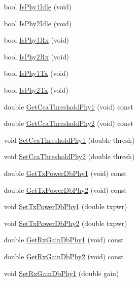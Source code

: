 \begin{DoxyCompactItemize}
bool \hyperlink{classns3_1_1UanPhyDual_a713fee4f4a35de9bdb221c438a88dc0c}{Is\+Phy1\+Idle} (void)
\item 
bool \hyperlink{classns3_1_1UanPhyDual_ab4afd036817f6497e6a714ccab5d90d3}{Is\+Phy2\+Idle} (void)
\item 
bool \hyperlink{classns3_1_1UanPhyDual_af2f8efc8f969f5f88afc81bbdcc7121d}{Is\+Phy1\+Rx} (void)
\item 
bool \hyperlink{classns3_1_1UanPhyDual_ae22b1ff319f186509609ce0b6cfbff62}{Is\+Phy2\+Rx} (void)
\item 
bool \hyperlink{classns3_1_1UanPhyDual_a5c798904649f2bdccd1d0c1bad3f8850}{Is\+Phy1\+Tx} (void)
\item 
bool \hyperlink{classns3_1_1UanPhyDual_ae32437818c85d5cfcd3ab0de93f70a26}{Is\+Phy2\+Tx} (void)
\item 
double \hyperlink{classns3_1_1UanPhyDual_a56c584e508c76f84527eca347a192313}{Get\+Cca\+Threshold\+Phy1} (void) const 
\item 
double \hyperlink{classns3_1_1UanPhyDual_a4367de133e6bceab236c6888e71f3d66}{Get\+Cca\+Threshold\+Phy2} (void) const 
\item 
void \hyperlink{classns3_1_1UanPhyDual_ad2bd673788abd93eb7c3f45cea08f3cf}{Set\+Cca\+Threshold\+Phy1} (double thresh)
\item 
void \hyperlink{classns3_1_1UanPhyDual_af2fecd3586f6a2579da091c2e811cb0e}{Set\+Cca\+Threshold\+Phy2} (double thresh)
\item 
double \hyperlink{classns3_1_1UanPhyDual_ad5c14dc1baed7a53bc6fe061688db62e}{Get\+Tx\+Power\+Db\+Phy1} (void) const 
\item 
double \hyperlink{classns3_1_1UanPhyDual_ad065043640d6b4a0155d48fa13c68ea1}{Get\+Tx\+Power\+Db\+Phy2} (void) const 
\item 
void \hyperlink{classns3_1_1UanPhyDual_a404ee2a8dc730f0f6a1c89097119c4c6}{Set\+Tx\+Power\+Db\+Phy1} (double txpwr)
\item 
void \hyperlink{classns3_1_1UanPhyDual_aec0d6e6aca2f6fccd2954f43dd8fda56}{Set\+Tx\+Power\+Db\+Phy2} (double txpwr)
\item 
double \hyperlink{classns3_1_1UanPhyDual_a8c1ff7b73b3b9f24b800b9c6c12d88e1}{Get\+Rx\+Gain\+Db\+Phy1} (void) const 
\item 
double \hyperlink{classns3_1_1UanPhyDual_ab0a8e06dcfba7ec81293547ed1d8c275}{Get\+Rx\+Gain\+Db\+Phy2} (void) const 
\item 
void \hyperlink{classns3_1_1UanPhyDual_a4208c9b2161ec71a76bc0b17084b805b}{Set\+Rx\+Gain\+Db\+Phy1} (double gain)
\item 

\end{DoxyCompactItemize}
